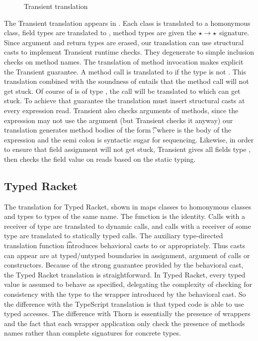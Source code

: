 \documentclass{tex/llncs}
\begin{document}
\begin{figure}[hb]
	\medskip
	
	\hrulefill
	
	\caption{Transient translation}\label{tptr2}
\end{figure}

The Transient translation appears in . Each class is translated
to a homonymous \kafka class, field types are translated to \any, method
types are given the $\star \to \star$ signature. Since argument and return
types are erased, our translation can use structural casts to implement
Transient runtime checks. They degenerate to simple inclusion checks on
method names.  The translation of method invocation makes explicit the
Transient guarantee.  A method call \Call\e\m\ep is translated to
\KCall\e\m\ep\any\any if the type \e is not \any. This translation combined
with the soundness of \kafka entails that the method call will not get
stuck.  Of course of \e is of type \any, the call will be translated to
\DynCall\e\m\ep which can get stuck.  To achieve that guarantee the
translation must insert structural casts at every expression read. Transient
also checks arguments of methods, since the expression may not use the
argument (but Transient checks it anyway) our translation generates method
bodies of the form \SubCast\t\x; \e where \e is the body of the expression
and the semi colon is syntactic sugar for sequencing. Likewise, in order to 
ensure that field assignment will not get stuck, Transient gives all fields 
type \any, then checks the field value on reads based on the static typing.

\subsection{Typed Racket}

The translation for Typed Racket, shown in  maps classes to
homonymous classes and types to types of the same name. The  function
is the identity.  Calls with a receiver of type \any are translated to
\kafka dynamic calls, and calls with a receiver of some type \C are
translated to statically typed calls. The auxiliary type-directed
translation function \TAG\e\Env\t introduces behavioral casts to \any or \C
appropriately. Thus casts can appear are at typed/untyped boundaries in
assignment, argument of calls or constructors. Because of the strong
guarantee provided by the behavioral cast, the Typed Racket translation is
straightforward. In Typed Racket, every typed value is assumed to behave as
specified, delegating the complexity of checking for consistency with the
type to the wrapper introduced by the behavioral cast.  So the difference
with the TypeScript translation is that typed code is able to use typed
accesses. The difference with Thorn is essentially the presence of wrappers
and the fact that each wrapper application only check the presence of
methods names rather than complete signatures for concrete types.
\end{document}
